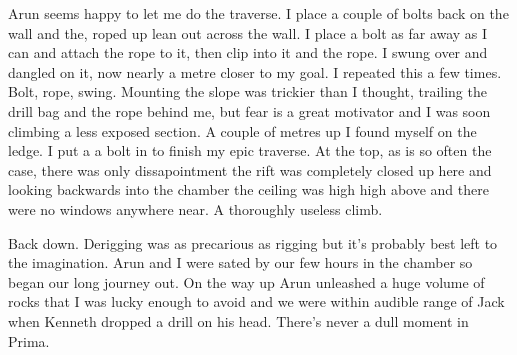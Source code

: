 Arun seems happy to let me do the traverse. I place a couple of bolts back on the wall and the, roped up lean out across the wall. I place a bolt as far away as I can and attach the rope to it, then clip into it and the rope. I swung over and dangled on it, now nearly a metre closer to my goal. I repeated this a few times. Bolt, rope, swing. Mounting the slope was trickier than I thought, trailing the drill bag and the rope behind me, but fear is a great motivator and I was soon climbing a less exposed section. A couple of metres up I found myself on the ledge. I put a a bolt in to finish my epic traverse. At the top, as is so often the case, there was only dissapointment the rift was completely closed up here and looking backwards into the chamber the ceiling was high high above and there were no windows anywhere near. A thoroughly useless climb. 

Back down. Derigging was as precarious as rigging but it's probably best left to the imagination. Arun and I were sated by our few hours in the chamber so began our long journey out. On the way up Arun unleashed a huge volume of rocks that I was lucky enough to avoid and we were within audible range of Jack when Kenneth dropped a drill on his head. There's never a dull moment in Prima.



